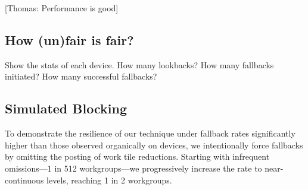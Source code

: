 \documentclass[sigconf]{acmart}
\newcommand{\thomas}[1]{{\footnotesize\color{orange}[Thomas: #1]}}
\begin{document}
\thomas{Performance is good}

\subsection{How (un)fair is fair?}
Show the stats of each device. How many lookbacks?  How many fallbacks initiated? How many successful fallbacks?

\subsection{Simulated Blocking}
To demonstrate the resilience of our technique under fallback rates significantly higher than those observed organically on devices, we intentionally force fallbacks by omitting the posting of work tile reductions. Starting with infrequent omissions---1 in 512 workgroups---we progressively increase the rate to near-continuous levels, reaching 1 in 2 workgroups.
\end{document}

